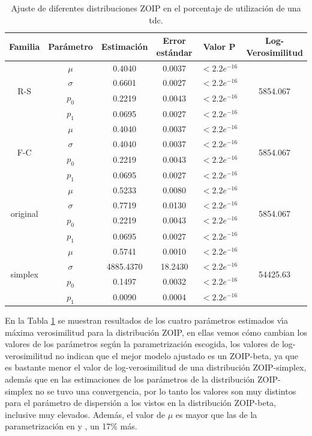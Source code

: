 \begin{table}[!hbt]
{\scriptsize
\begin{center}
\begin{tabular}{|c|c|ccc|c|}\hline
Familia & Par\'{a}metro & Estimaci\'{o}n & Error est\'{a}ndar & Valor P & Log-Verosimilitud\\ \hline

\multirow{4}{*}{R-S} &$\mu$ &0.4040	&0.0037	&$<2.2e^{-16}$ &\multirow{4}{*}{5854.067}\\
& $\sigma$ & 0.6601	&0.0027	&$<2.2e^{-16}$& \\
& $p_0$ & 0.2219	&0.0043	&$<2.2e^{-16}$ &\\
& $p_1$ & 0.0695	&0.0027	&$<2.2e^{-16}$ &\\ \hline

\multirow{4}{*}{F-C} &$\mu$ & 0.4040	&0.0037	&$<2.2e^{-16}$ &\multirow{4}{*}{5854.067}\\
& $\sigma$ & 0.4040	&0.0037	&$<2.2e^{-16}$ &\\
& $p_0$ & 0.2219	&0.0043	&$<2.2e^{-16}$ &\\
& $p_1$ & 0.0695	&0.0027	&$<2.2e^{-16}$ &\\ \hline

\multirow{4}{*}{original} &$\mu$ & 0.5233	&0.0080	&$<2.2e^{-16}$&\multirow{4}{*}{5854.067} \\
& $\sigma$ & 0.7719	&0.0130	&$<2.2e^{-16}$& \\
& $p_0$ & 0.2219	&0.0043	&$<2.2e^{-16}$& \\
& $p_1$ & 0.0695	&0.0027	&$<2.2e^{-16}$& \\ \hline

\multirow{4}{*}{simplex} &$\mu$ & 0.5741	&0.0010	&$<2.2e^{-16}$ &\multirow{4}{*}{54425.63}\\
& $\sigma$ & 4885.4370	&18.2430	&$<2.2e^{-16}$ &\\
& $p_0$ & 0.1497	&0.0032	&$<2.2e^{-16}$ &\\
& $p_1$ & 0.0090	&0.0004	&$<2.2e^{-16}$ &\\ \hline

\end{tabular}
\caption{Ajuste de diferentes distribuciones ZOIP en el porcentaje de utilizaci\'{o}n de una tdc.}
\label{T_Apli_SC}
\end{center}
}
\end{table}


En la Tabla \ref{T_Apli_SC} se muestran resultados de los cuatro par\'{a}metros estimados v\'{\i}a m\'{a}xima verosimilitud para la distribuci\'{o}n ZOIP, en ellas vemos c\'{o}mo cambian los valores de los par\'{a}metros seg\'{u}n la parametrizaci\'{o}n escogida, los valores de log-verosimilitud no indican que el mejor modelo ajustado es un ZOIP-beta, ya que es bastante menor el valor de log-verosimilitud de una distribuci\'{o}n ZOIP-simplex, adem\'{a}s que en las estimaciones de los par\'{a}metros de la distribuci\'{o}n ZOIP-simplex no se tuvo una convergencia, por lo tanto los valores son muy distintos para el par\'{a}metro de dispersi\'{o}n a los vistos en la distribuci\'{o}n ZOIP-beta, inclusive muy elevados. Adem\'{a}s, el valor de $\mu$ es mayor que las de la parametrizaci\'{o}n en \cite{Stasinopoulos2} y \cite{Ferrari2}, un 17\% m\'{a}s.\\

